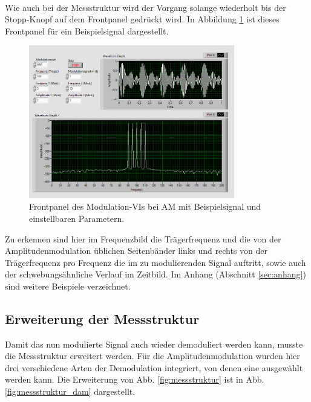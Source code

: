 \

Wie auch bei der Messstruktur wird der Vorgang solange wiederholt bis der Stopp-Knopf auf dem Frontpanel gedrückt wird.  
In Abbildung \ref{fig:am_example} ist dieses Frontpanel für ein Beispielsignal dargestellt.

\begin{figure}[H]
	\centering
	\includegraphics[width=0.8\textwidth]{pic/am_example.png}
	\caption{Frontpanel des Modulation-VIs bei AM mit Beispielsignal und einstellbaren Parametern.}
	\label{fig:am_example}	
\end{figure} 

Zu erkennen sind hier im Frequenzbild die Trägerfrequenz und die von der Amplitudenmodulation üblichen Seitenbänder links und rechts von der Trägerfrequenz pro Frequenz die im zu modulierenden Signal auftritt, sowie auch der schwebungsähnliche Verlauf im Zeitbild.
Im Anhang (Abschnitt \ref*{sec:anhang}) sind weitere Beispiele verzeichnet.



\subsection{Erweiterung der Messstruktur}

Damit das nun modulierte Signal auch wieder demoduliert werden kann, musste die Messstruktur erweitert werden.
Für die Amplitudenmodulation wurden hier drei verschiedene Arten der Demodulation integriert, von denen eine ausgewählt werden kann.
Die Erweiterung von Abb. \ref{fig:messstruktur} ist in Abb. \ref{fig:messstruktur_dam} dargestellt.
	
\


